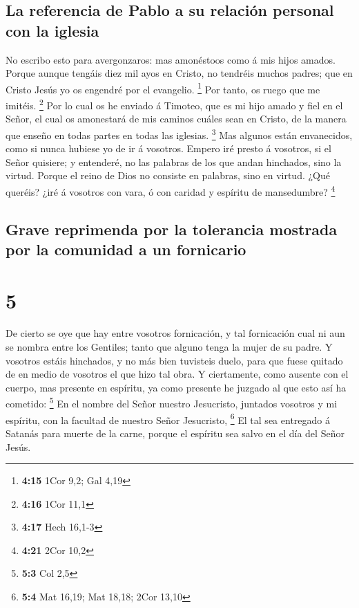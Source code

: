 \hypertarget{la-referencia-de-pablo-a-su-relaciuxf3n-personal-con-la-iglesia}{%
\subsection{La referencia de Pablo a su relación personal con la
iglesia}\label{la-referencia-de-pablo-a-su-relaciuxf3n-personal-con-la-iglesia}}

 No escribo esto para avergonzaros: mas amonéstoos como á
mis hijos amados.  Porque aunque tengáis diez mil ayos en
Cristo, no tendréis muchos padres; que en Cristo Jesús yo os engendré
por el evangelio. \footnote{\textbf{4:15} 1Cor 9,2; Gal 4,19}
 Por tanto, os ruego que me imitéis. \footnote{\textbf{4:16}
  1Cor 11,1}  Por lo cual os he enviado á Timoteo, que es
mi hijo amado y fiel en el Señor, el cual os amonestará de mis caminos
cuáles sean en Cristo, de la manera que enseño en todas partes en todas
las iglesias. \footnote{\textbf{4:17} Hech 16,1-3}  Mas
algunos están envanecidos, como si nunca hubiese yo de ir á vosotros.
 Empero iré presto á vosotros, si el Señor quisiere; y
entenderé, no las palabras de los que andan hinchados, sino la virtud.
 Porque el reino de Dios no consiste en palabras, sino en
virtud.  ¿Qué queréis? ¿iré á vosotros con vara, ó con
caridad y espíritu de mansedumbre? \footnote{\textbf{4:21} 2Cor 10,2}

\hypertarget{grave-reprimenda-por-la-tolerancia-mostrada-por-la-comunidad-a-un-fornicario}{%
\subsection{Grave reprimenda por la tolerancia mostrada por la comunidad
a un
fornicario}\label{grave-reprimenda-por-la-tolerancia-mostrada-por-la-comunidad-a-un-fornicario}}

\hypertarget{section-4}{%
\section{5}\label{section-4}}

 De cierto se oye que hay entre vosotros fornicación, y tal
fornicación cual ni aun se nombra entre los Gentiles; tanto que alguno
tenga la mujer de su padre.  Y vosotros estáis hinchados, y
no más bien tuvisteis duelo, para que fuese quitado de en medio de
vosotros el que hizo tal obra.  Y ciertamente, como ausente
con el cuerpo, mas presente en espíritu, ya como presente he juzgado al
que esto así ha cometido: \footnote{\textbf{5:3} Col 2,5} 
En el nombre del Señor nuestro Jesucristo, juntados vosotros y mi
espíritu, con la facultad de nuestro Señor Jesucristo, \footnote{\textbf{5:4}
  Mat 16,19; Mat 18,18; 2Cor 13,10}  El tal sea entregado á
Satanás para muerte de la carne, porque el espíritu sea salvo en el día
del Señor Jesús.


